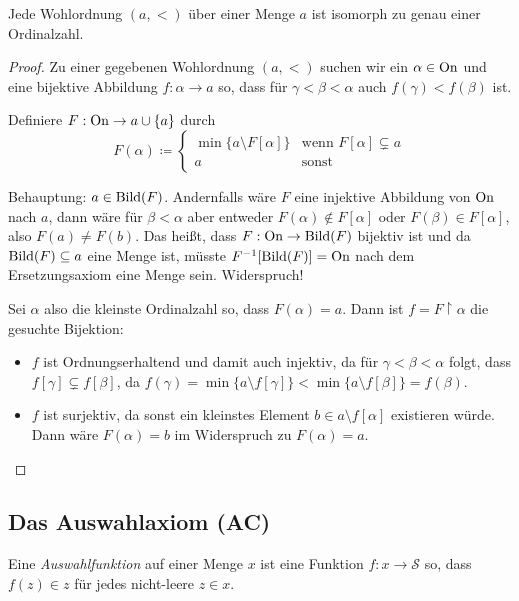 \begin{satz}
	Jede Wohlordnung $(a,<)$ über einer Menge $a$ ist isomorph zu genau einer Ordinalzahl.
\end{satz}
\begin{proof}
	Zu einer gegebenen Wohlordnung $(a,<)$ suchen wir ein $\alpha\in \operatorname{On}$ und eine bijektive Abbildung $f:\alpha\to a$ so, dass für $\gamma<\beta<\alpha$ auch $f(\gamma)<f(\beta)$ ist.
	
	Definiere $F:\operatorname{On}\to a\cup\{a\}$ durch
	$$
	F(\alpha)\coloneqq\begin{cases}
		\min\{a\setminus F[\alpha]\} & \text{wenn } F[\alpha]\subsetneq a\\
		a & \text{sonst}
	\end{cases}
	$$
	
	Behauptung: $a\in \operatorname{Bild}(F)$. Andernfalls wäre $F$ eine injektive Abbildung von $\operatorname{On}$ nach $a$, dann wäre für $\beta<\alpha$ aber entweder $F(\alpha)\notin F[\alpha]$ oder $F(\beta)\in F[\alpha]$, also $F(a)\neq F(b)$. Das heißt, dass $F:\operatorname{On}\to \operatorname{Bild}(F)$ bijektiv ist und da $\operatorname{Bild}(F)\subseteq a$ eine Menge ist, müsste $F^{-1}[\operatorname{Bild}(F)]=\operatorname{On}$ nach dem Ersetzungsaxiom eine Menge sein. Widerspruch!
	
	Sei $\alpha$ also die kleinste Ordinalzahl so, dass $F(\alpha)=a$. Dann ist $f=F\upharpoonright \alpha$ die gesuchte Bijektion:
	\begin{itemize}
		\item $f$ ist Ordnungserhaltend und damit auch injektiv, da für $\gamma<\beta<\alpha$ folgt, dass $f[\gamma]\subsetneq f[\beta]$, da $f(\gamma)=\min\{a\setminus f[\gamma]\}<\min\{a\setminus f[\beta]\}=f(\beta)$.
		\item $f$ ist surjektiv, da sonst ein kleinstes Element $b\in a\setminus f[\alpha]$ existieren würde. Dann wäre $F(\alpha)=b$ im Widerspruch zu $F(\alpha)=a$.
	\end{itemize}
\end{proof}

\subsection{Das Auswahlaxiom (AC)}

\begin{definition}[Auswahlfunktionen]
	Eine \textit{Auswahlfunktion} auf einer Menge $x$ ist eine Funktion $f:x\to\mathcal{S}$ so, dass $f(z)\in z$ für jedes nicht-leere $z\in x$.
\end{definition}

